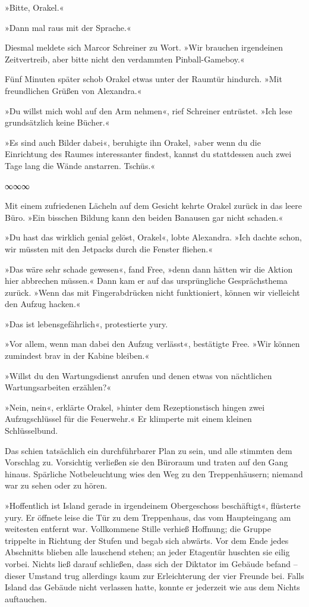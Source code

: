 »Bitte, Orakel.«

»Dann mal raus mit der Sprache.«

Diesmal meldete sich Marcor Schreiner zu Wort. »Wir brauchen irgendeinen Zeitvertreib, aber bitte nicht den verdammten Pinball-Gameboy.«

Fünf Minuten später schob Orakel etwas unter der Raumtür hindurch. »Mit freundlichen Grüßen von Alexandra.«

»Du willst mich wohl auf den Arm nehmen«, rief Schreiner entrüstet. »Ich lese grundsätzlich keine Bücher.«

»Es sind auch Bilder dabei«, beruhigte ihn Orakel, »aber wenn du die Einrichtung des Raumes interessanter findest, kannst du stattdessen auch zwei Tage lang die Wände anstarren. Tschüs.«

\begin{center}
	∞∞∞
\end{center}

Mit einem zufriedenen Lächeln auf dem Gesicht kehrte Orakel zurück in das leere Büro. »Ein bisschen Bildung kann den beiden Banausen gar nicht schaden.«

»Du hast das wirklich genial gelöst, Orakel«, lobte Alexandra. »Ich dachte schon, wir müssten mit den Jetpacks durch die Fenster fliehen.«

»Das wäre sehr schade gewesen«, fand Free, »denn dann hätten wir die Aktion hier abbrechen müssen.« Dann kam er auf das ursprüngliche Gesprächsthema zurück. »Wenn das mit Fingerabdrücken nicht funktioniert, können wir vielleicht den Aufzug hacken.«

»Das ist lebensgefährlich«, protestierte yury.

»Vor allem, wenn man dabei den Aufzug verlässt«, bestätigte Free. »Wir können zumindest brav in der Kabine bleiben.«

»Willst du den Wartungsdienst anrufen und denen etwas von nächtlichen Wartungsarbeiten erzählen?«

»Nein, nein«, erklärte Orakel, »hinter dem Rezeptionstisch hingen zwei Aufzugschlüssel für die Feuerwehr.« Er klimperte mit einem kleinen Schlüsselbund.

Das schien tatsächlich ein durchführbarer Plan zu sein, und alle stimmten dem Vorschlag zu. Vorsichtig verließen sie den Büroraum und traten auf den Gang hinaus. Spärliche Notbeleuchtung wies den Weg zu den Treppenhäusern; niemand war zu sehen oder zu hören.

»Hoffentlich ist Island gerade in irgendeinem Obergeschoss beschäftigt«, flüsterte yury. Er öffnete leise die Tür zu dem Treppenhaus, das vom Haupteingang am weitesten entfernt war. Vollkommene Stille verhieß Hoffnung; die Gruppe trippelte in Richtung der Stufen und begab sich abwärts. Vor dem Ende jedes Abschnitts blieben alle lauschend stehen; an jeder Etagentür huschten sie eilig vorbei. Nichts ließ darauf schließen, dass sich der Diktator im Gebäude befand – dieser Umstand trug allerdings kaum zur Erleichterung der vier Freunde bei. Falls Island das Gebäude nicht verlassen hatte, konnte er jederzeit wie aus dem Nichts auftauchen.

